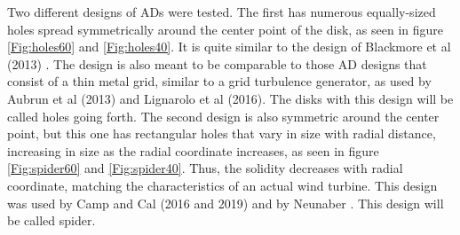 Two different designs of \gls{AD}s were tested. The first has numerous equally-sized holes spread symmetrically around the center point of the disk, as seen in figure \ref{Fig:holes60} and \ref{Fig:holes40}. It is quite similar to the design of Blackmore et al (2013) \cite{Blackmore2013}. The design is also meant to be comparable to those \gls{AD} designs that consist of a thin metal grid, similar to a grid turbulence generator, as used by Aubrun et al (2013) \cite{Aubrun2013} and Lignarolo et al (2016)\cite{Lignarolo2016}. The disks with this design will be called \gls{holes} going forth. The second design is also symmetric around the center point, but this one has rectangular holes that vary in size with radial distance, increasing in size as the radial coordinate increases, as seen in figure \ref{Fig:spider60} and \ref{Fig:spider40}. Thus, the solidity decreases with radial coordinate, matching the characteristics of an actual wind turbine. This design was used by Camp and Cal (2016 and 2019) \cite{Camp2016} \cite{Camp2019} and by Neunaber \cite{Neunaber}. This design will be called \gls{spider}. 



